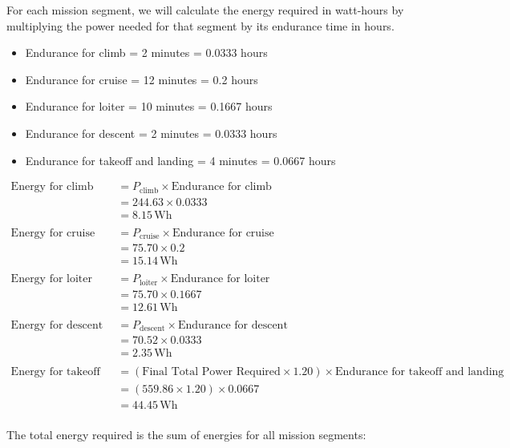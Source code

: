 \documentclass[12 pt]{article}
\begin{document}
For each mission segment, we will calculate the energy required in watt-hours by multiplying the power needed for that segment by its endurance time in hours.

\begin{itemize}
    \item Endurance for climb = 2 minutes = 0.0333 hours
    \item Endurance for cruise = 12 minutes = 0.2 hours
    \item Endurance for loiter = 10 minutes = 0.1667 hours
    \item Endurance for descent = 2 minutes = 0.0333 hours
    \item Endurance for takeoff and landing = 4 minutes = 0.0667 hours
\end{itemize}

\begin{align*}
\text{Energy for climb} &= P_{\text{climb}} \times \text{Endurance for climb} \\
&= 244.63 \times 0.0333 \\
&= 8.15 \, \text{Wh} \\
\\
\text{Energy for cruise} &= P_{\text{cruise}} \times \text{Endurance for cruise} \\
&= 75.70 \times 0.2 \\
&= 15.14 \, \text{Wh} \\
\\
\text{Energy for loiter} &= P_{\text{loiter}} \times \text{Endurance for loiter} \\
&= 75.70 \times 0.1667 \\
&= 12.61 \, \text{Wh} \\
\\
\text{Energy for descent} &= P_{\text{descent}} \times \text{Endurance for descent} \\
&= 70.52 \times 0.0333 \\
&= 2.35 \, \text{Wh} \\
\\
\text{Energy for takeoff and landing} &= (\text{Final Total Power Required} \times 1.20) \times \text{Endurance for takeoff and landing} \\
&= (559.86 \times 1.20) \times 0.0667 \\
&= 44.45 \, \text{Wh} \\
\end{align*}

The total energy required is the sum of energies for all mission segments:
\end{document}
